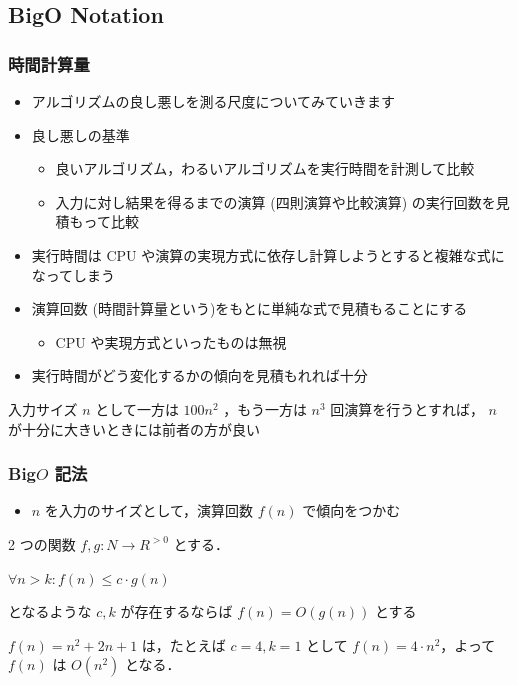 \subsection{Big\textendash O Notation}
\begin{frame}[shrink]
\frametitle{時間計算量}
  \begin{itemize}
\item アルゴリズムの良し悪しを測る尺度についてみていきます
\item 良し悪しの基準
    \begin{itemize}
\item 良いアルゴリズム，わるいアルゴリズムを実行時間を計測して比較
\item 入力に対し結果を得るまでの演算 (四則演算や比較演算) の実行回数を見積もって比較
    \end{itemize}
\item 実行時間は CPU や演算の実現方式に依存し計算しようとすると複雑な式になってしまう
\item 演算回数 (時間計算量という)をもとに単純な式で見積もることにする
    \begin{itemize}
\item CPU や実現方式といったものは無視
    \end{itemize}
\item 実行時間がどう変化するかの傾向を見積もれれば十分
  \end{itemize}
  \begin{example}
入力サイズ $n$ として一方は \(100n^2\) ，もう一方は \(n^3\) 回演算を行うとすれば，
 $n$ が十分に大きいときには前者の方が良い
  \end{example}
\end{frame}
\begin{frame}[shrink]
\frametitle{Big\textendash$O$ 記法}
  \begin{itemize}
\item $n$ を入力のサイズとして，演算回数 \(f(n)\) で傾向をつかむ
  \end{itemize}
  \begin{definition}
2 つの関数 \(f, g\colon N\rightarrow R^{>0}\) とする．
    \begin{center}
\(\forall n>k\colon f(n)\leq c\cdot g(n)\)
    \end{center}
となるような \(c, k\) が存在するならば \(f(n)=O(g(n))\) とする
  \end{definition}
  \begin{example}
\(f(n)=n^2+2n+1\) は，たとえば \(c=4, k=1\) として \(f(n)=4\cdot n^2\)，よって \(f(n)\) は \(O(n^2)\) となる．
  \end{example}
\end{frame}
